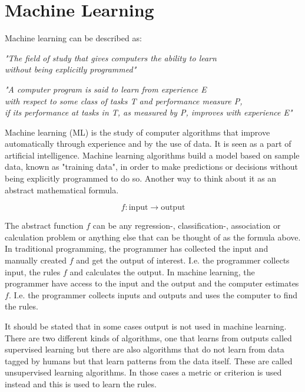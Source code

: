 \section{Machine Learning}

Machine learning can be described as:

\begin{center}
    \textit{"The field of study that gives computers the ability to learn \\
    without being explicitly programmed"}
\end{center}

\begin{center}
    \textit{"A computer program is said to learn from experience E \\
     with respect to some class of tasks T and performance measure P, \\
     if its performance at tasks in T, as measured by P, improves with experience E"}
\end{center}

Machine learning (ML) is the study of computer algorithms that improve 
automatically through experience and by the use of data. It is seen as a part of 
artificial intelligence. Machine learning algorithms build a model based on 
sample data, known as "training data", in order to make predictions or decisions 
without being explicitly programmed to do so. Another way to think about it as 
an abstract mathematical formula.

\begin{equation*}
    f: \text{input} \rightarrow \text{output}
\end{equation*}

The abstract function $f$ can be any regression-, classification-, association
or calculation problem or anything else that can be thought of as the formula
above. In traditional programming, the programmer has collected the input
and manually created $f$ and get the output of interest. I.e. the programmer
collects input, the rules $f$ and calculates the output. In machine learning, 
the programmer have access to the input and the output 
and the computer estimates $f$. I.e. the programmer collects inputs and outputs
and uses the computer to find the rules. 

It should be stated that in some cases output is not used in machine learning. 
There are two different kinds of algorithms, one that learns from outputs called
supervised learning but there are also algorithms that do not learn from data 
tagged by humans but that learn patterns from the data itself.
These are called unsupervised learning algorithms. In those cases a metric or 
criterion is used instead and this is used to learn the rules.
\newpage

